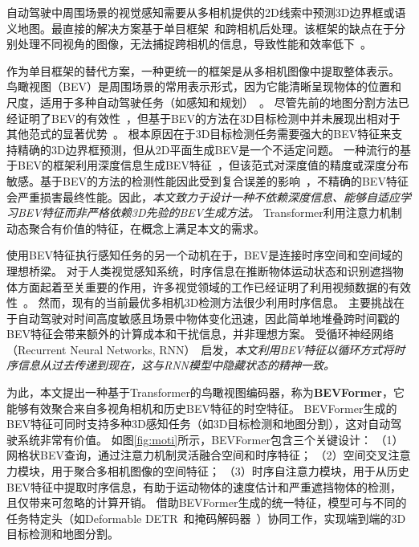 \documentclass{article}
\begin{document}
自动驾驶中周围场景的视觉感知需要从多相机提供的2D线索中预测3D边界框或语义地图。最直接的解决方案基于单目框架~\cite{wang2021fcos3d,wang2022probabilistic,park2021pseudo,reiher2020sim2real,bruls2019right}和跨相机后处理。该框架的缺点在于分别处理不同视角的图像，无法捕捉跨相机的信息，导致性能和效率低下~\cite{philion2020lift,wang2022detr3d}。




作为单目框架的替代方案，一种更统一的框架是从多相机图像中提取整体表示。
%
鸟瞰视图（BEV）是周围场景的常用表示形式，因为它能清晰呈现物体的位置和尺度，适用于多种自动驾驶任务（如感知和规划）~\cite{ng2020bev}。
尽管先前的地图分割方法已经证明了BEV的有效性~\cite{philion2020lift,hu2021fiery,ng2020bev}，但基于BEV的方法在3D目标检测中并未展现出相对于其他范式的显著优势~\cite{wang2022detr3d,park2021pseudo,reading2021categorical}。
根本原因在于3D目标检测任务需要强大的BEV特征来支持精确的3D边界框预测，但从2D平面生成BEV是一个不适定问题。
一种流行的基于BEV的框架利用深度信息生成BEV特征~\cite{wang2019pseudo,philion2020lift,reading2021categorical}，但该范式对深度值的精度或深度分布敏感。基于BEV的方法的检测性能因此受到复合误差的影响~\cite{wang2022detr3d}，不精确的BEV特征会严重损害最终性能。因此，\emph{本文致力于设计一种不依赖深度信息、能够自适应学习BEV特征而非严格依赖3D先验的BEV生成方法。}
Transformer利用注意力机制动态聚合有价值的特征，在概念上满足本文的需求。




使用BEV特征执行感知任务的另一个动机在于，BEV是连接时序空间和空间域的理想桥梁。
%
对于人类视觉感知系统，时序信息在推断物体运动状态和识别遮挡物体方面起着至关重要的作用，许多视觉领域的工作已经证明了利用视频数据的有效性~\cite{brazil2020kinematic,ma20223d,luo2018fast,qi2021offboard,kang2016object}。
%
然而，现有的当前最优多相机3D检测方法很少利用时序信息。
%
主要挑战在于自动驾驶对时间高度敏感且场景中物体变化迅速，因此简单地堆叠跨时间戳的BEV特征会带来额外的计算成本和干扰信息，并非理想方案。
受循环神经网络（Recurrent Neural Networks, RNN）~\cite{hochreiter1997long,cho2014properties}启发，\emph{本文利用BEV特征以循环方式将时序信息从过去传递到现在，这与RNN模型中隐藏状态的精神一致。}



为此，本文提出一种基于Transformer的鸟瞰视图编码器，称为\textbf{BEVFormer}，它能够有效聚合来自多视角相机和历史BEV特征的时空特征。
BEVFormer生成的BEV特征可同时支持多种3D感知任务（如3D目标检测和地图分割），这对自动驾驶系统非常有价值。
如图\ref{fig:moti}所示，BEVFormer包含三个关键设计：
（1）网格状BEV查询，通过注意力机制灵活融合空间和时序特征；
（2）空间交叉注意力模块，用于聚合多相机图像的空间特征；
（3）时序自注意力模块，用于从历史BEV特征中提取时序信息，有助于运动物体的速度估计和严重遮挡物体的检测，且仅带来可忽略的计算开销。
借助BEVFormer生成的统一特征，模型可与不同的任务特定头（如Deformable DETR~\cite{zhu2020deformable}和掩码解码器~\cite{li2021panoptic}）协同工作，实现端到端的3D目标检测和地图分割。 
\end{document}
